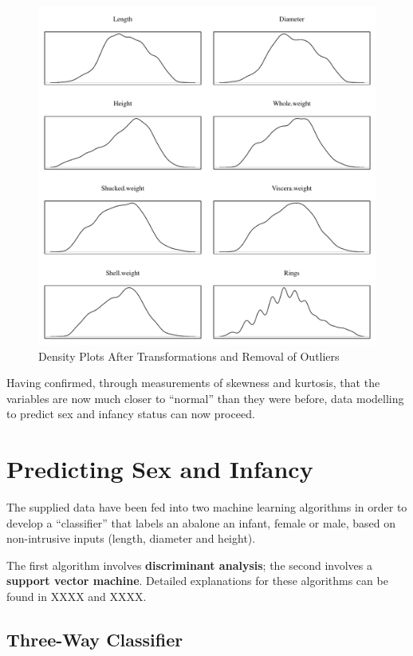 \documentclass[11pt, a4paper]{article}
\begin{document}
    \begin{figure}[ht]
        \centering
        \includegraphics[width=\textwidth]{1.7.pdf}
        \caption{Density Plots After Transformations and Removal of Outliers}
        \label{density.t}
    \end{figure}

    Having confirmed, through measurements of skewness and kurtosis, that the variables are now much closer to ``normal'' than they were before, data modelling to predict sex and infancy status can now proceed.

    \section{Predicting Sex and Infancy}

    The supplied data have been fed into two machine learning algorithms in order to develop a ``classifier'' that labels an abalone an infant, female or male, based on non-intrusive inputs (length, diameter and height). 

    The first algorithm involves \textbf{discriminant analysis}; the second involves a \textbf{support vector machine}. Detailed explanations for these algorithms can be found in XXXX and XXXX. 

    \subsection{Three-Way Classifier}
\end{document}
